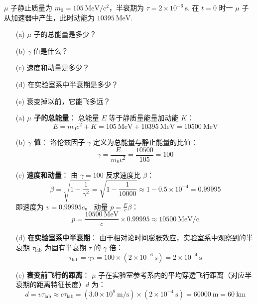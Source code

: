 \begin{exercise}\label{ex:9.20}
$\mu$ 子静止质量为 $m_0 = 105 \ \mathrm{MeV/c^2}$，半衰期为 $\tau = 2 \times 10^{-6} \ \mathrm{s}$. 在 $t=0$ 时一 $\mu$ 子从加速器中产生，此时动能为 $10395 \ \mathrm{MeV}$.
\begin{enumerate}
  \item[(a)] $\mu$ 子的总能量是多少？
  \item[(b)] $\gamma$ 值是什么？
  \item[(c)] 速度和动量是多少？
  \item[(d)] 在实验室系中半衰期是多少？
  \item[(e)] 衰变掉以前，它能飞多远？
\end{enumerate}
\end{exercise}
\begin{solution}
\begin{enumerate}
    \item[(a)] \textbf{$\mu$ 子的总能量}：
    总能量 $E$ 等于静质量能量加动能 $K$：
    $$ E = m_0 c^2 + K = 105 \ \mathrm{MeV} + 10395 \ \mathrm{MeV} = 10500 \ \mathrm{MeV} $$

    \item[(b)] \textbf{$\gamma$ 值}：
    洛伦兹因子 $\gamma$ 定义为总能量与静止能量的比值：
    $$ \gamma = \frac{E}{m_0 c^2} = \frac{10500}{105} = 100 $$

    \item[(c)] \textbf{速度和动量}：
    由 $\gamma = 100$ 反求速度比 $\beta$：
    $$ \beta = \sqrt{1 - \frac{1}{\gamma^2}} = \sqrt{1 - \frac{1}{10000}} \approx 1 - 0.5 \times 10^{-4} = 0.99995 $$
    即速度为 $v = 0.99995c$。
    动量 $p = \frac{E}{c} \beta$：
    $$ p = \frac{10500 \ \mathrm{MeV}}{c} \times 0.99995 \approx 10500 \ \mathrm{MeV/c} $$

    \item[(d)] \textbf{在实验室系中半衰期}：
    由于相对论时间膨胀效应，实验室系中观察到的半衰期 $\tau_{\mathrm{lab}}$ 为固有半衰期 $\tau$ 的 $\gamma$ 倍：
    $$ \tau_{\mathrm{lab}} = \gamma \tau = 100 \times (2 \times 10^{-6} \ \mathrm{s}) = 2 \times 10^{-4} \ \mathrm{s} $$

    \item[(e)] \textbf{衰变前飞行的距离}：
    $\mu$ 子在实验室参考系内的平均穿透飞行距离（对应半衰期的距离特征长度）$d$ 为：
    $$ d = v \tau_{\mathrm{lab}} \approx c \tau_{\mathrm{lab}} = (3.0 \times 10^8 \ \mathrm{m/s}) \times (2 \times 10^{-4} \ \mathrm{s}) = 60000 \ \mathrm{m} = 60 \ \mathrm{km} $$
\end{enumerate}
\end{solution}




